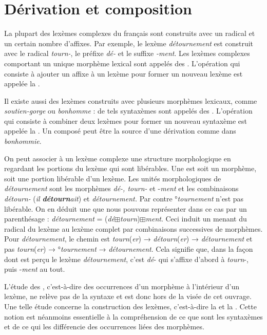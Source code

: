 \section{Dérivation et composition}\label{sec:2.2.15}

La plupart des lexèmes complexes du français sont construits avec un radical et un certain nombre d’affixes. Par exemple, le lexème \textit{détournement} est construit avec le radical \textit{tourn-}, le préfixe \textit{dé-} et le suffixe \textit{{}-ment}. Les lexèmes complexes comportant un unique morphème lexical sont appelés des . L’opération qui consiste à ajouter un affixe à un lexème pour former un nouveau lexème est appelée la .

Il existe aussi des lexèmes construits avec plusieurs morphèmes lexicaux, comme \textit{soutien-gorge} ou \textit{bonhomme} : de tels syntaxèmes sont appelés des . L’opération qui consiste à combiner deux lexèmes pour former un nouveau syntaxème est appelée la . Un composé peut être la source d’une dérivation comme dans \textit{bonhommie}.

On peut associer à un lexème complexe une structure morphologique en regardant les portions du lexème qui sont libérables. Une  est soit un morphème, soit une portion libérable d’un lexème. Les unités morphologiques de \textit{détournement} sont les morphèmes \textit{dé-, tourn-} et -\textit{ment} et les combinaisons \textit{détourn-} (\textit{il} \textbf{\textit{détourn}}\textit{ait}) et \textit{détournement.} Par contre °\textit{tournement} n’est pas libérable. On en déduit une  que nous pouvons représenter dans ce cas par un parenthésage : \textit{détournement} = (\textit{dé}${\boxplus}$\textit{tourn})${\boxplus}$\textit{ment}. Ceci induit un  menant du radical du lexème au lexème complet par combinaisons successives de morphèmes. Pour \textit{détournement}, le chemin est \textit{tourn}(\textit{er}) → \textit{détourn}(\textit{er}) → \textit{détournement} et pas \textit{tourn}(\textit{er}) → °\textit{tournement} → \textit{détournement}. Cela signifie que, dans la façon dont est perçu le lexème \textit{détournement}, c’est \textit{dé}{}- qui s’affixe d’abord à \textit{tourn}{}-, puis -\textit{ment} au tout.

L’étude des , c’est-à-dire des occurrences d’un morphème à l’intérieur d’un lexème, ne relève pas de la syntaxe et est donc hors de la visée de cet ouvrage. Une telle étude concerne la construction des lexèmes, c’est-à-dire la  et la . Cette notion est néanmoins essentielle à la compréhension de ce que sont les syntaxèmes et de ce qui les différencie des occurrences liées des morphèmes.


